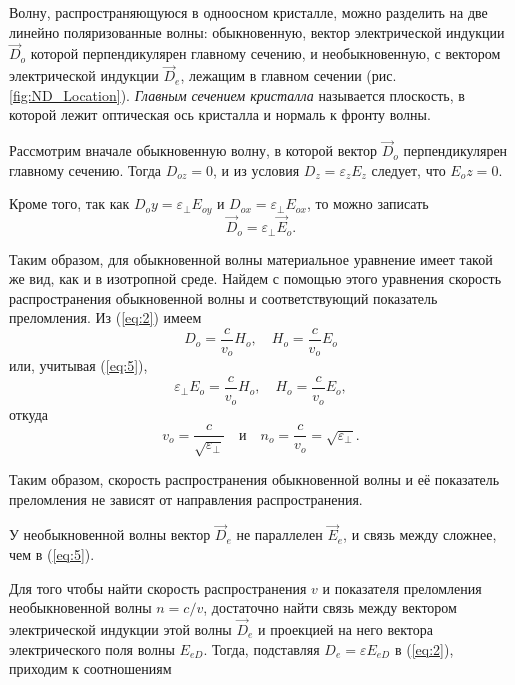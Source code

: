 \documentclass[a4paper, 12pt]{article}
\begin{document}
	Волну, распространяющуюся в одноосном кристалле, можно разделить на две линейно поляризованные волны: обыкновенную, вектор электрической индукции $\vec{D}_o$ которой перпендикулярен главному сечению, и необыкновенную, с вектором электрической индукции $\vec{D}_e$, лежащим в главном сечении (рис. \ref{fig:ND_Location}). \textit{Главным сечением кристалла} называется плоскость, в которой лежит оптическая ось кристалла и нормаль к фронту волны.\par
	Рассмотрим вначале обыкновенную волну, в которой вектор $\vec{D}_o$ перпендикулярен главному сечению. Тогда $D_{oz}=0$, и из условия $D_z=\varepsilon_zE_z$ следует, что $E_oz=0$.\par
	Кроме того, так как $D_oy=\varepsilon_\perp E_{oy}$ и $D_{ox}=\varepsilon_\perp E_{ox}$, то можно записать
	\begin{equation}
		\vec{D}_o=\varepsilon_\perp\vec{E}_o.
		\label{eq:5}
	\end{equation}
	\par
	Таким образом, для обыкновенной волны материальное уравнение имеет такой же вид, как и в изотропной среде. Найдем с помощью этого уравнения скорость распространения обыкновенной волны и соответствующий показатель преломления. Из (\ref{eq:2}) имеем
	\begin{equation}
		D_o=\frac{c}{v_o	}H_o,\quad H_o=\frac{c}{v_o}E_o
	\end{equation}
	или, учитывая (\ref{eq:5}),
	\begin{equation}
		\varepsilon_\perp E_o=\frac{c}{v_o}H_o,\quad H_o=\frac{c}{v_o}E_o,
	\end{equation}
	откуда
	\begin{equation}
		v_o=\frac{c}{\sqrt{\varepsilon_\perp}}\quad\text{и}\quad n_o=\frac{c}{v_o}=\sqrt{\varepsilon_\perp}.
	\end{equation}
	\par
	Таким образом, скорость распространения обыкновенной волны и её показатель преломления не зависят от направления распространения.\par
	У необыкновенной волны вектор $\vec{D}_e$ не параллелен $\vec{E}_e$, и связь между сложнее, чем в (\ref{eq:5}).\par
	Для того чтобы найти скорость распространения $v$ и показателя преломления необыкновенной волны $n=c/v$, достаточно найти связь между вектором электрической индукции этой волны $\vec{D}_e$ и проекцией на него вектора электрического поля волны $E_{eD}$. Тогда, подставляя $D_e=\varepsilon E_{eD}$ в (\ref{eq:2}), приходим к соотношениям
\end{document}
